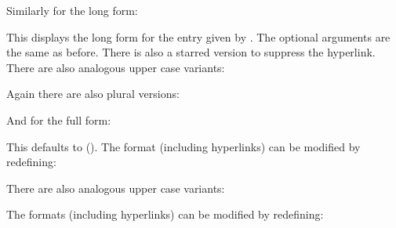 \documentclass[report,inlinetitle]{nlctdoc}
\begin{document}
Similarly for the long form:
\begin{definition}[\DescribeMacro{\acrlong}]
\end{definition}
This displays the long form for the entry given by .
The optional arguments are the same as before.  There is also a starred 
version to suppress the hyperlink. There are also analogous upper case 
variants:
\begin{definition}[\DescribeMacro{\Acrlong}]
\end{definition}
\begin{definition}[\DescribeMacro{\ACRlong}]
\end{definition}
Again there are also plural versions:
\begin{definition}[\DescribeMacro{\acrlongpl}]
\end{definition}
\begin{definition}[\DescribeMacro{\Acrlongpl}]
\end{definition}
\begin{definition}[\DescribeMacro{\ACRlongpl}]
\end{definition}

And for the full form:
\begin{definition}[\DescribeMacro{\acrfull}]
\end{definition}
This defaults to  ().
The format (including hyperlinks) can be modified by redefining:
\begin{definition}[\DescribeMacro{\acrfullfmt}]
\end{definition}

There are also analogous upper case variants:
\begin{definition}[\DescribeMacro{\Acrfull}]
\end{definition}
\begin{definition}[\DescribeMacro{\ACRfull}]
\end{definition}
The formats (including hyperlinks) can be modified by redefining:
\begin{definition}[\DescribeMacro{\Acrfullfmt}]
\end{definition}
\begin{definition}[\DescribeMacro{\ACRfullfmt}]
\end{definition}
\end{document}

